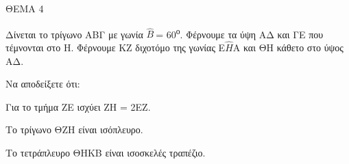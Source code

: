 
ΘΕΜΑ 4

Δίνεται το τρίγωνο ΑΒΓ με γωνία $\widehat{Β}\ $= 60\textsuperscript{ο}. Φέρνουμε τα ύψη ΑΔ και ΓΕ που τέμνονται στο Η. Φέρνουμε ΚΖ διχοτόμο της γωνίας Ε$\widehat{Η}$Α και ΘΗ κάθετο στο ύψος ΑΔ.

Να αποδείξετε ότι:

\begin{alist}
\item Για το τμήμα ΖΕ ισχύει ΖΗ = 2ΕΖ. 

\item Το τρίγωνο ΘΖΗ είναι ισόπλευρο. 

\item Το τετράπλευρο ΘΗΚΒ είναι ισοσκελές τραπέζιο. 


\end{alist}
